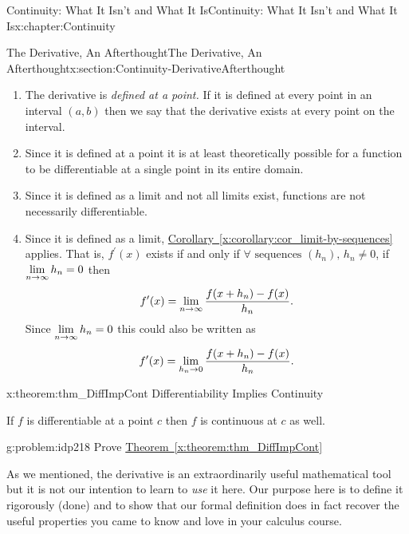 \begin{chapterptx}{Continuity: What It Isn't and What It Is}{}{Continuity: What It Isn't and What It Is}{}{}{x:chapter:Continuity}
\begin{sectionptx}{The Derivative, An Afterthought}{}{The Derivative, An Afterthought}{}{}{x:section:Continuity-DerivativeAfterthought}
		\par
		\begin{enumerate}
			\item{}The derivative is \emph{defined at a point.} If it is defined at every point in an interval \((a,b)\) then we say that the derivative exists at every point on the interval.%
			\item{}Since it is defined at a point it is at least theoretically possible for a function to be differentiable at a single point in its entire domain.%
			\item{}Since it is defined as a limit and not all limits exist, functions are not necessarily differentiable.%
			\item{}Since it is defined as a limit, \hyperref[x:corollary:cor_limit-by-sequences]{Corollary~{\xreffont\ref{x:corollary:cor_limit-by-sequences}}} applies. That is, \(f^\prime(x)\) exists if and only if \(\forall \text{ sequences } (h_n),\, h_n\ne 0\), if \({\displaystyle\lim_{n\rightarrow \infty}h_n}=0\) then%
			\begin{equation*}
				f^\prime{(x)} =
				{\displaystyle\lim_{n\rightarrow \infty}\frac{f(x+h_n)-f(x)}{h_n}} \text{.}
			\end{equation*}
			Since \({\displaystyle\lim_{n\rightarrow \infty}h_n}=0\) this could also be written as%
			\begin{equation*}
				f^\prime{(x)} = {\displaystyle\lim_{h_n\rightarrow 0}\frac{f(x+h_n)-f(x)}{h_n}}\text{.}
			\end{equation*}
		\end{enumerate}
		\begin{theorem}{}{}{x:theorem:thm_DiffImpCont}%
			\alert{Differentiability Implies Continuity}%
			\par
			If \(f\) is differentiable at a point \(c\) then \(f\) is continuous at \(c\) as well.%
		\end{theorem}
		\begin{problem}{}{g:problem:idp218}%
			Prove \hyperref[x:theorem:thm_DiffImpCont]{Theorem~{\xreffont\ref{x:theorem:thm_DiffImpCont}}}%
		\end{problem}
		As we mentioned, the derivative is an extraordinarily useful mathematical tool but it is not our intention to learn to \emph{use} it here.  Our purpose here is to define it rigorously (done) and to show that our formal definition does in fact recover the useful properties you came to know and love in your calculus course.%
		\par

\end{sectionptx}
\end{chapterptx}
